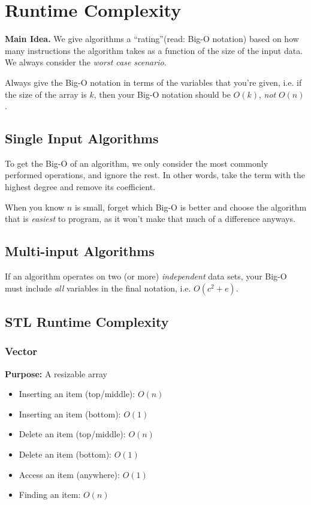 \documentclass[class=article, crop=false]{standalone}
\begin{document}
  \tableofcontents
  \newpage
  \section{Runtime Complexity}
  \textbf{Main Idea.} We give algorithms a ``rating''(read: Big-O notation) based on how many instructions the algorithm takes as a function of the size of the input data. We always consider the \emph{worst case scenario}.
  \begin{note}{}
    Always give the Big-O notation in terms of the variables that you're given, i.e. if the size of the array is $k$, then your Big-O notation should be $O(k)$, \emph{not} $O(n)$.
  \end{note}
  \subsection{Single Input Algorithms}
  To get the Big-O of an algorithm, we only consider the most commonly performed operations, and ignore the rest. In other words, take the term with the highest degree and remove its coefficient. \par
  When you know $n$ is small, forget which Big-O is better and choose the algorithm that is \emph{easiest} to program, as it won't make that much of a difference anyways.
  \subsection{Multi-input Algorithms}
  If an algorithm operates on two (or more) \emph{independent} data sets, your Big-O must include \emph{all} variables in the final notation, i.e. $O(c^2 + e)$.
  \subsection{STL Runtime Complexity}
  \subsubsection{Vector} 
  \textbf{Purpose:} A resizable array
  \begin{itemize}
    \item Inserting an item (top/middle): $O(n)$
    \item Inserting an item (bottom): $O(1)$
    \item Delete an item (top/middle): $O(n)$
    \item Delete an item (bottom): $O(1)$
    \item Access an item (anywhere): $O(1)$
    \item Finding an item: $O(n)$
  \end{itemize}
\end{document}

